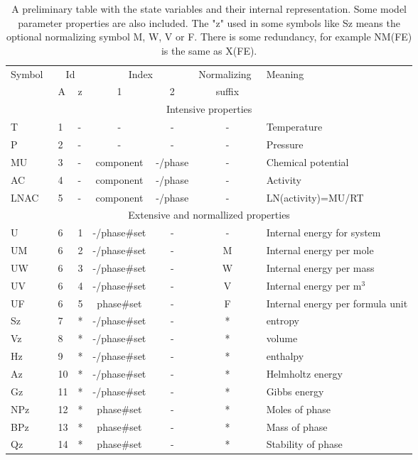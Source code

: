 \documentclass[11pt]{article}
\begin{document}
\begin{table}[!ht]
\caption{A preliminary table with the state variables and their
  internal representation.  Some model parameter properties are also
  included.  The "z" used in some symbols like Sz means the optional
  normalizing symbol M, W, V or F.  There is some redundancy, for
  example NM(FE) is the same as X(FE).}\label{tab:statev} {\small
\begin{tabular}{|lllcccl|}\hline
Symbol~&\multicolumn{2}{c}{Id}&\multicolumn{2}{c}{Index}&Normalizing~&Meaning\\
      & A & z  & 1 & 2                     &  suffix     & \\\hline
\multicolumn{7}{|c|}{Intensive properties}\\\hline
T      & 1 &- & -         & -    & - & Temperature\\
P      & 2 &- & -         & -    & - & Pressure\\
MU     & 3 &- & component & -/phase  & - & Chemical potential\\
AC     & 4 &- & component & -/phase  & - & Activity\\
LNAC   & 5 &- & component & -/phase  & - & LN(activity)=MU/RT\\\hline
\multicolumn{7}{|c|}{Extensive and normallized properties}\\\hline
U      & 6 & 1 & -/phase\#set & - & - & Internal energy for system\\
UM     & 6 & 2 & -/phase\#set & - & M & Internal energy per mole\\
UW     & 6 & 3 & -/phase\#set & - & W & Internal energy per mass\\
UV     & 6 & 4 & -/phase\#set & - & V & Internal energy per m$^3$\\
UF     & 6 & 5 & phase\#set   & - & F & Internal energy per formula unit\\
Sz     & 7 & * & -/phase\#set & - & * & entropy\\
Vz     & 8 & * & -/phase\#set & - & * & volume\\
Hz     & 9 & * & -/phase\#set & - & * & enthalpy\\
Az     & 10 & * & -/phase\#set & - & * & Helmholtz energy\\
Gz     & 11 & * & -/phase\#set & - & * & Gibbs energy\\
NPz    & 12 & * &  phase\#set & - & * & Moles of phase\\
BPz    & 13 & * & phase\#set & - & * & Mass of phase\\
Qz     & 14 & * & phase\#set & - & *  & Stability of phase\\

\end{tabular}}
\end{table}
\end{document}
